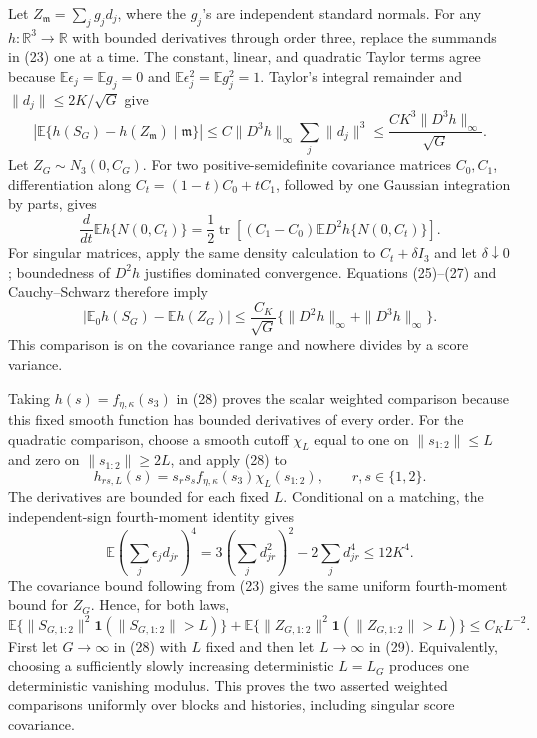 Let \(Z_{\mathfrak m}=\sum_jg_jd_j\), where the \(g_j\)'s are independent standard normals.  For any \(h:\mathbb R^3\to\mathbb R\) with bounded derivatives through order three, replace the summands in (23) one at a time.  The constant, linear, and quadratic Taylor terms agree because \(\mathbb E\epsilon_j=\mathbb Eg_j=0\) and \(\mathbb E\epsilon_j^2=\mathbb Eg_j^2=1\).  Taylor's integral remainder and \(\|d_j\|\leq2K/\sqrt G\) give
\[
 \left|\mathbb E\{h(S_G)-h(Z_{\mathfrak m})\mid\mathfrak m\}\right|
 \leq C\|D^3h\|_\infty\sum_j\|d_j\|^3
 \leq \frac{C K^3\|D^3h\|_\infty}{\sqrt G}.              \tag{26}
\]
Let \(Z_G\sim N_3(0,C_G)\).  For two positive-semidefinite covariance matrices \(C_0,C_1\), differentiation along \(C_t=(1-t)C_0+tC_1\), followed by one Gaussian integration by parts, gives
\[
 \frac{d}{dt}\mathbb Eh\{N(0,C_t)\}
 =\frac12\operatorname{tr}\left[(C_1-C_0)
                  \mathbb E D^2h\{N(0,C_t)\}\right].       \tag{27}
\]
For singular matrices, apply the same density calculation to \(C_t+\delta I_3\) and let \(\delta\downarrow0\); boundedness of \(D^2h\) justifies dominated convergence.  Equations (25)--(27) and Cauchy--Schwarz therefore imply
\[
 \left|\mathbb E_0h(S_G)-\mathbb Eh(Z_G)\right|
 \leq\frac{C_K}{\sqrt G}
       \{\|D^2h\|_\infty+\|D^3h\|_\infty\}.              \tag{28}
\]
This comparison is on the covariance range and nowhere divides by a score variance.

Taking \(h(s)=f_{\eta,\kappa}(s_3)\) in (28) proves the scalar weighted comparison because this fixed smooth function has bounded derivatives of every order.  For the quadratic comparison, choose a smooth cutoff \(\chi_L\) equal to one on \(\|s_{1:2}\|\leq L\) and zero on \(\|s_{1:2}\|\geq2L\), and apply (28) to
\[
 h_{rs,L}(s)=s_rs_s f_{\eta,\kappa}(s_3)\chi_L(s_{1:2}),
 \qquad r,s\in\{1,2\}.
\]
The derivatives are bounded for each fixed \(L\).  Conditional on a matching, the independent-sign fourth-moment identity gives
\[
 \mathbb E\left(\sum_j\epsilon_jd_{jr}\right)^4
 =3\left(\sum_jd_{jr}^2\right)^2-2\sum_jd_{jr}^4\leq12K^4.
\]
The covariance bound following from (23) gives the same uniform fourth-moment bound for \(Z_G\).  Hence, for both laws,
\[
 \mathbb E\{\|S_{G,1:2}\|^2\mathbf1(\|S_{G,1:2}\|>L)\}
 +\mathbb E\{\|Z_{G,1:2}\|^2\mathbf1(\|Z_{G,1:2}\|>L)\}
 \leq C_KL^{-2}.                                            \tag{29}
\]
First let \(G\to\infty\) in (28) with \(L\) fixed and then let \(L\to\infty\) in (29).  Equivalently, choosing a sufficiently slowly increasing deterministic \(L=L_G\) produces one deterministic vanishing modulus.  This proves the two asserted weighted comparisons uniformly over blocks and histories, including singular score covariance.

